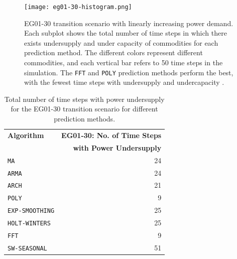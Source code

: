 \begin{figure}[]
	\centering
	\texttt{[image: eg01-30-histogram.png]} 
	\caption{
	EG01-30 transition scenario with linearly increasing power demand. 
	Each subplot shows the total number of time steps in which there exists 
	undersupply and under capacity of commodities for each prediction method. 
	The different colors represent different commodities, and each vertical bar
	refers to 50 time steps in the simulation.
    The \texttt{FFT} and \texttt{POLY} prediction methods perform the best, 
    with the fewest
	time steps with undersupply and undercapacity \cite{chee_arfc/transition-scenarios_2018}.}
	\label{fig:eg30under}
\end{figure}

\begin{table}[]
    \doublespacing
	\centering
        \caption{Total number of time steps with power undersupply for the 
        EG01-30 transition scenario for different prediction methods.}
		\label{tab:all-power}
		\small
        \begin{tabular}{lr}
		\hline
        \textbf{Algorithm} & \textbf{EG01-30: No. of Time Steps} \\ 
        & \textbf{with Power Undersupply} \\ \hline
		\texttt{MA}     		& 24 \\ 
		\texttt{ARMA}     	    & 24\\ 
		\texttt{ARCH}     	    & 21\\ 
		\texttt{POLY}      		&  9\\ 
		\texttt{EXP-SMOOTHING} 	& 25\\ 
		\texttt{HOLT-WINTERS}  	& 25\\ 
		\texttt{FFT}       		& 9\\ 
		\texttt{SW-SEASONAL}    & 51\\ \hline
	\end{tabular}
\end{table}


